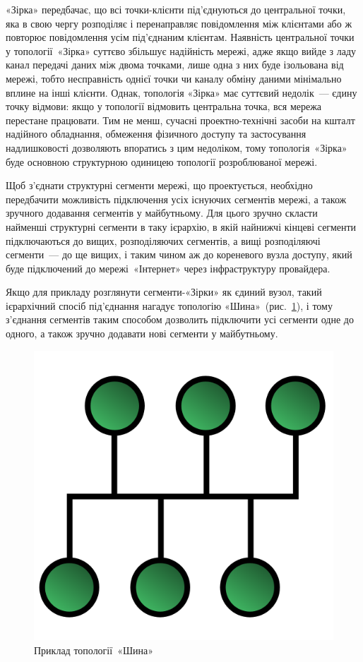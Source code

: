 \documentclass[
  ukrainian,
  simple,
]{eskdnaukvd}
\newlength{\gridunitwidth}
\begin{document}
      «Зірка» передбачає, що всі точки-клієнти під'єднуються до центральної точки, яка в свою чергу розподіляє і перенаправляє повідомлення між клієнтами або ж повторює повідомлення усім під'єднаним клієнтам. Наявність центральної точки у топології~«Зірка» суттєво збільшує надійність мережі, адже якщо вийде з ладу канал передачі даних між двома точками, лише одна з них буде ізольована від мережі, тобто несправність однієї точки чи каналу обміну даними мінімально вплине на інші клієнти. Однак, топологія «Зірка» має суттєвий недолік~— єдину точку відмови: якщо у топології відмовить центральна точка, вся мережа перестане працювати. Тим не менш, сучасні проектно-технічні засоби на кшталт надійного обладнання, обмеження фізичного доступу та застосування надлишковості дозволяють впоратись з цим недоліком, тому топологія~«Зірка» буде основною структурною одиницею топології розроблюваної мережі.

      Щоб з'єднати структурні сегменти мережі, що проектується, необхідно передбачити можливість підключення усіх існуючих сегментів мережі, а також зручного додавання сегментів у майбутньому. Для цього зручно скласти найменші структурні сегменти в таку ієрархію, в якій найнижчі кінцеві сегменти підключаються до вищих, розподіляючих сегментів, а вищі розподіляючі сегменти~— до ще вищих, і таким чином аж до кореневого вузла доступу, який буде підключений до мережі «Інтернет» через інфраструктуру провайдера.

      Якщо для прикладу розглянути сегменти-«Зірки» як єдиний вузол, такий ієрархічний спосіб під'єднання нагадує топологію «Шина»~(рис.~\ref{fig:topology-bus}), і тому з'єднання сегментів таким способом дозволить підключити усі сегменти одне до одного, а також зручно додавати нові сегменти у майбутньому.

      \begin{figure}[!htbp]
        \centering
        \includegraphics[width = 4 \gridunitwidth]{./assets/03-topology-bus.png}
        \caption{Приклад топології~«Шина»}
        \label{fig:topology-bus}
      \end{figure}
\end{document}
